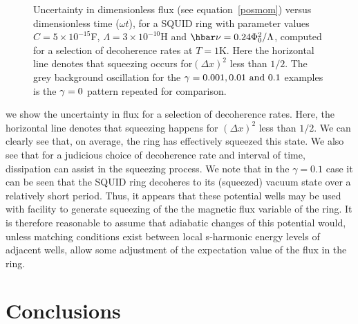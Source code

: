 \documentclass[twocolumn,a4paper,superscriptaddress,showpacs,floatfix,pra]{revtex4}
\begin{document}
\begin{figure}[!t]
\begin{center}
\end{center}
\caption{      Uncertainty     in     dimensionless      flux     (see
equation~\ref{posmom}) versus  dimensionless time ($\omega t$), for  a SQUID
ring  with parameter values  $C=5\times 10^{-15}$F,  $\Lambda =3\times
10^{-10}$H  and  $\hbar   \protect\nu  =0.24\Phi  _{0}^{2}/\Lambda  $,
computed  for a  selection of  decoherence rates  at $T=1$K.  Here the
horizontal  line  denotes  that  squeezing  occurs  for$\left(  \Delta
x\right) ^{2}$  less than $1/2$.  The grey background  oscillation for
the  $\protect\gamma=0.001,  0.01\text{  and  }0.1$  examples  is  the
$\protect\gamma=0$ pattern repeated for comparison.}
\label{f6}
\end{figure}
we  show  the uncertainty  in  flux  for  a selection  of  decoherence
rates. Here,  the horizontal line  denotes that squeezing  happens for
$\left(  \Delta x\right)  ^{2}$ less  than $1/2$.  We can  clearly see
that, on  average, the  ring has effectively  squeezed this  state. We
also see that for a  judicious choice of decoherence rate and interval
of time, dissipation can assist in the squeezing process. We note that
in the $\gamma=0.1$ case it can  be seen that the SQUID ring decoheres
to its (squeezed)  vacuum state over a relatively  short period. Thus,
it appears  that these  potential wells may  be used with  facility to
generate squeezing of  the the magnetic flux variable  of the ring. It
is  therefore reasonable  to  assume that  adiabatic  changes of  this
potential  would,  unless  matching  conditions  exist  between  local
s-harmonic energy  levels of adjacent wells, allow  some adjustment of
the expectation value of the flux in the ring.

\section*{Conclusions}
\end{document}
